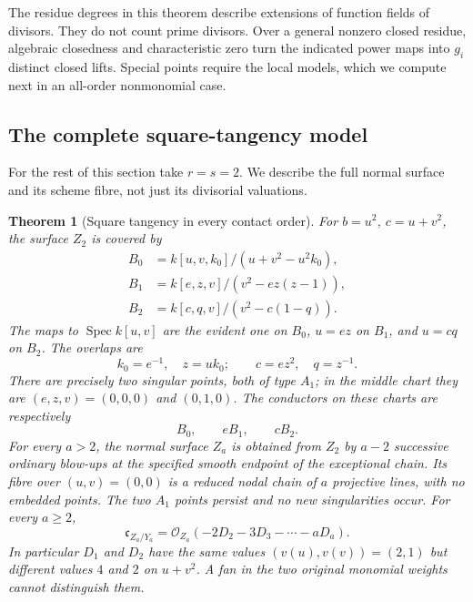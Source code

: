 \documentclass[11pt,reqno]{amsart}
\numberwithin{equation}{section}
\newtheorem{theorem}{Theorem}[section]
\theoremstyle{definition}\newtheorem{definition}[theorem]{Definition}
\theoremstyle{remark}\newtheorem{remark}[theorem]{Remark}
\newcommand{\OO}{\mathcal O}\newcommand{\II}{\mathcal I}
\DeclareMathOperator{\Spec}{Spec}\DeclareMathOperator{\PGL}{PGL}
\begin{document}
The residue degrees in this theorem describe extensions of function
fields of divisors. They do not count prime divisors. Over a general
nonzero closed residue, algebraic closedness and characteristic zero
turn the indicated power maps into $g_i$ distinct closed lifts. Special
points require the local models, which we compute next in an all-order
nonmonomial case.

\subsection{The complete square-tangency model}
For the rest of this section take $r=s=2$. We describe the full
normal surface and its scheme fibre, not just its divisorial valuations.

\begin{theorem}[Square tangency in every contact order]
\label{thm:square-tangency-v171}
For $b=u^2$, $c=u+v^2$, the surface $Z_2$ is covered by
\begin{align}
 B_0&=k[u,v,k_0]/(u+v^2-u^2k_0),\label{eq:square-chart-zero-v171}\\
 B_1&=k[e,z,v]/(v^2-ez(z-1)),\label{eq:square-chart-one-v171}\\
 B_2&=k[c,q,v]/(v^2-c(1-q)).\label{eq:square-chart-two-v171}
\end{align}
The maps to $\Spec k[u,v]$ are the evident one on $B_0$,
$u=ez$ on $B_1$, and $u=cq$ on $B_2$. The overlaps are
\[
 k_0=e^{-1},\quad z=uk_0;
 \qquad c=ez^2,\quad q=z^{-1}.
\]
There are precisely two singular points, both of type $A_1$; in the
middle chart they are $(e,z,v)=(0,0,0)$ and $(0,1,0)$.
The conductors on these charts are respectively
\begin{equation}\label{eq:square-chart-conductors-v171}
 B_0,\qquad eB_1,\qquad cB_2.
\end{equation}
For every $a>2$, the normal surface $Z_a$ is obtained from $Z_2$ by
$a-2$ successive ordinary blow-ups at the specified smooth endpoint
of the exceptional chain. Its fibre over $(u,v)=(0,0)$ is a reduced
nodal chain of $a$ projective lines, with no embedded points. The two
$A_1$ points persist and no new singularities occur. For every $a\geq2$,
\begin{equation}\label{eq:square-global-conductor-v171}
 \mathfrak c_{Z_a/Y_a}
 =\OO_{Z_a}(-2D_2-3D_3-\cdots-aD_a).
\end{equation}
In particular $D_1$ and $D_2$ have the same values
$(v(u),v(v))=(2,1)$ but different values $4$ and $2$ on $u+v^2$.
A fan in the two original monomial weights cannot distinguish them.
\end{theorem}
\end{document}
